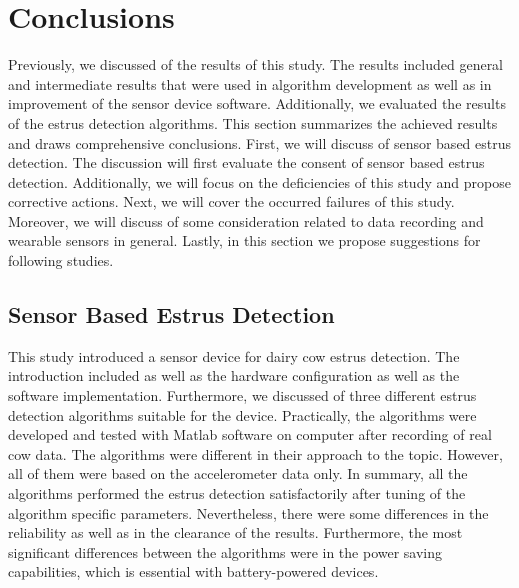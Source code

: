 \documentclass[english,12pt,a4paper,pdftex,elec,utf8]{aaltothesis}
\begin{document}
\section{Conclusions} \label{conclusionssection}

Previously, we discussed of the results of this study. The results included general and intermediate results that were used in algorithm development as well as in improvement of the sensor device software. Additionally, we evaluated the results of the estrus detection algorithms. This section summarizes the achieved results and draws comprehensive conclusions. First, we will discuss of sensor based estrus detection. The discussion will first evaluate the consent of sensor based estrus detection. Additionally, we will focus on the deficiencies of this study and propose corrective actions. Next, we will cover the occurred failures of this study. Moreover, we will discuss of some consideration related to data recording and wearable sensors in general. Lastly, in this section we propose suggestions for following studies.

\subsection{Sensor Based Estrus Detection}

This study introduced a sensor device for dairy cow estrus detection. The introduction included as well as the hardware configuration as well as the software implementation. Furthermore, we discussed of three different estrus detection algorithms suitable for the device. Practically, the algorithms were developed and tested with Matlab software on computer after recording of real cow data. The algorithms were different in their approach to the topic. However, all of them were based on the accelerometer data only. In summary, all the algorithms performed the estrus detection satisfactorily after tuning of the algorithm specific parameters. Nevertheless, there were some differences in the reliability as well as in the clearance of the results. Furthermore, the most significant differences between the algorithms were in the power saving capabilities, which is essential with battery-powered devices.
\end{document}
